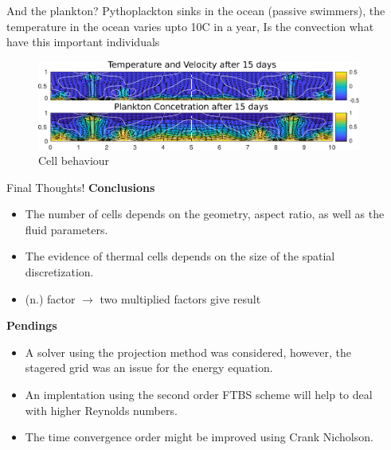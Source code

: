 \documentclass[final]{beamer}
\newlength{\sepwid}
\newlength{\onecolwid}
\begin{document}
\begin{frame}[t]
\begin{columns}[t]
\begin{column}{\sepwid}\end{column} %

\begin{column}{\onecolwid} %


\begin{block}{And the plankton?}
\textbf{}
	Pythoplackton sinks in the ocean (passive swimmers), 
the temperature in the ocean varies upto 10C in a year,
Is the convection what have this important individuals
\begin{figure}
\includegraphics[width=1.0\linewidth]{images/planktonSim.pdf}
\caption{Cell behaviour}
\end{figure}

\end{block}




\begin{alertblock}{Final Thoughts!}
\textbf{Conclusions}
\begin{itemize}
\item The number of cells depends on the geometry, aspect ratio, as well as the fluid parameters.
\item The evidence of thermal cells depends on the size of the spatial discretization.
\item (n.) factor $\rightarrow$ two multiplied factors give result
\end{itemize}
\textbf{Pendings}
\begin{itemize}
\item A solver using the projection method was considered, however, the stagered grid was an issue for the energy equation.
\item An implentation using the second order FTBS scheme will help to deal with higher Reynolds numbers.
\item The time convergence order might be improved using Crank Nicholson.
\end{itemize}


\end{alertblock}
\end{column}
\end{columns}
\end{frame}
\end{document}
